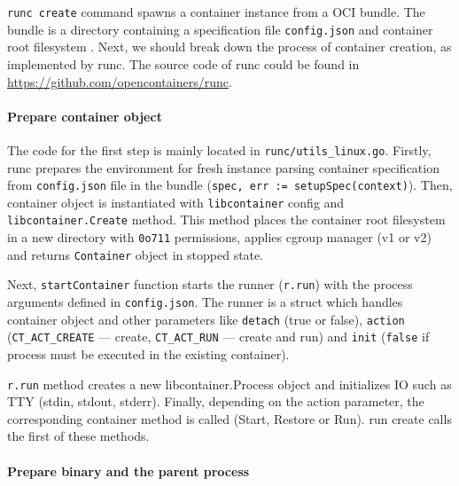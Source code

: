 \texttt{runc create} command spawns a container instance from a OCI bundle. The bundle is a directory containing a specification file \texttt{config.json} and container root filesystem \cite{m:runc-create}. Next, we should break down the process of container creation, as implemented by runc. The source code of runc could be found in \url{https://github.com/opencontainers/runc}.

\paragraph*{Prepare container object}
The code for the first step is mainly located in \texttt{runc/utils\_linux.go}. Firstly, runc prepares the environment for fresh instance parsing container specification from \texttt{config.json} file in the bundle (\texttt{spec, err := setupSpec(context)}). Then, container object is instantiated with \texttt{libcontainer} config and \texttt{libcontainer.Create} method. This method places the container root filesystem in a new directory with \texttt{0o711} permissions, applies cgroup manager (v1 or v2) and returns \texttt{Container} object in stopped state.

Next, \texttt{startContainer} function starts the runner (\texttt{r.run}) with the process arguments defined in \texttt{config.json}. The runner is a struct which handles container object and other parameters like \texttt{detach} (true or false), \texttt{action} (\texttt{CT\_ACT\_CREATE} — create, \texttt{CT\_ACT\_RUN} — create and run) and \texttt{init} (\texttt{false} if process must be executed in the existing container).

\texttt{r.run} method creates a new libcontainer.Process object and initializes IO such as TTY (stdin, stdout, stderr). Finally, depending on the action parameter, the corresponding container method is called (Start, Restore or Run). run create calls the first of these methods.

\paragraph*{Prepare binary and the parent process}

